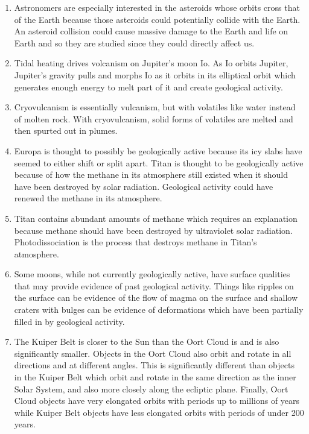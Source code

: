 \documentclass[../hw2.tex]{subfiles}
\begin{document}
    \begin{enumerate}
        \item Astronomers are especially interested in the asteroids whose orbits cross that of the Earth because those asteroids could potentially collide with the Earth. An asteroid collision could cause massive damage to the Earth and life on Earth and so they are studied since they could directly affect us.
        \item Tidal heating drives volcanism on Jupiter's moon Io. As Io orbits Jupiter, Jupiter's gravity pulls and morphs Io as it orbits in its elliptical orbit which generates enough energy to melt part of it and create geological activity. 
        \item Cryovulcanism is essentially vulcanism, but with volatiles like water instead of molten rock. With cryovulcanism, solid forms of volatiles are melted and then spurted out in plumes.
        \item Europa is thought to possibly be geologically active because its icy slabs have seemed to either shift or split apart. Titan is thought to be geologically active because of how the methane in its atmosphere still existed when it should have been destroyed by solar radiation. Geological activity could have renewed the methane in its atmosphere.
        \item Titan contains abundant amounts of methane which requires an explanation because methane should have been destroyed by ultraviolet solar radiation. Photodissociation is the process that destroys methane in Titan's atmosphere.  
        \item Some moons, while not currently geologically active, have surface qualities that may provide evidence of past geological activity. Things like ripples on the surface can be evidence of the flow of magma on the surface and shallow craters with bulges can be evidence of deformations which have been partially filled in by geological activity.
        \item The Kuiper Belt is closer to the Sun than the Oort Cloud is and is also significantly smaller. Objects in the Oort Cloud also orbit and rotate in all directions and at different angles. This is significantly different than objects in the Kuiper Belt which orbit and rotate in the same direction as the inner Solar System, and also more closely along the ecliptic plane. Finally, Oort Cloud objects have very elongated orbits with periods up to millions of years while Kuiper Belt objects have less elongated orbits with periods of under 200 years.

\end{enumerate}
\end{document}
